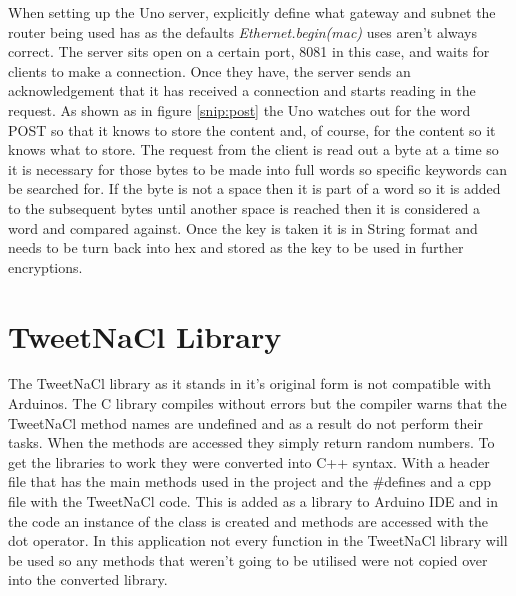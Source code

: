 When setting up the Uno server, explicitly define what gateway and subnet the router being used has as the defaults \emph{Ethernet.begin(mac)} uses aren't always correct. The server sits open on a certain port, 8081 in this case, and waits for clients to make a connection. Once they have, the server sends an acknowledgement that it has received a connection and starts reading in the request. As shown as in figure \ref{snip:post} the Uno watches out for the word POST so that it knows to store the content and, of course, for the content so it knows what to store. The request from the client is read out a byte at a time so it is necessary for those bytes to be made into full words so specific keywords can be searched for. If the byte is not a space then it is part of a word so it is added to the subsequent bytes until another space is reached then it is considered a word and compared against. Once the key is taken it is in String format and needs to be turn back into hex and stored as the key to be used in further encryptions.


\section{TweetNaCl Library}

The TweetNaCl library as it stands in it's original form is not compatible with Arduinos. The C library compiles without errors but the compiler warns that the TweetNaCl method names are undefined and as a result do not perform their tasks. When the methods are accessed they simply return random numbers. To get the libraries to work they were converted into C++ syntax. With a header file that has the main methods used in the project and the \#defines and a cpp file with the TweetNaCl code. This is added as a library to Arduino IDE and in the code an instance of the class is created and methods are accessed with the dot operator. In this application not every function in the TweetNaCl library will be used so any methods that weren't going to be utilised were not copied over into the converted library.



